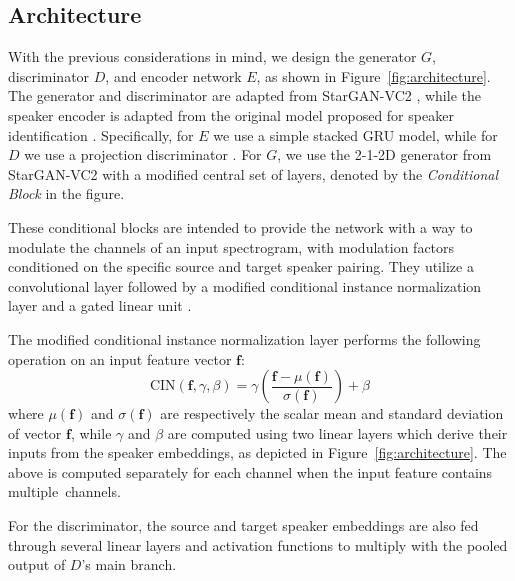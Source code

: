 \subsection{Architecture}
With the previous considerations in mind, we design the generator $G$, discriminator $D$, and encoder network $E$, as shown in Figure~\ref{fig:architecture}.
The generator and discriminator are adapted from StarGAN-VC2 \cite{stargan-vc2}, while the speaker encoder
is adapted from the original model proposed for speaker identification \cite{GE2E}. 
Specifically, for $E$ 
we use a simple stacked GRU model, while for $D$ we use a projection discriminator \cite{projection_discriminator}. 
For $G$, we use the 2-1-2D generator from StarGAN-VC2 with a modified central set of layers, denoted by the \textit{Conditional Block} in the figure. 

These conditional blocks are intended to provide the network with a way to modulate the channels of an input spectrogram, with modulation factors conditioned on the specific source and target speaker pairing.
They utilize a convolutional layer 
followed by a modified conditional instance normalization layer \cite{CIN} and a gated linear unit \cite{glu}.

The modified conditional instance normalization layer performs the following operation on an input feature vector $\mathbf{f}$:
\begin{equation}
\text{CIN}(\mathbf{f}, \gamma, \beta) 
= \gamma \left( \frac{\mathbf{f} - \mu(\mathbf{f})}{\sigma (\mathbf{f}) } \right) + \beta
\end{equation}
where $\mu(\mathbf{f})$ and $\sigma(\mathbf{f})$ are respectively the scalar mean and standard deviation of vector $\mathbf{f}$, while $\gamma$ and $\beta$ are computed using two linear layers which derive their inputs from the speaker embeddings, as depicted in Figure~\ref{fig:architecture}. The above
is computed separately for each channel when the input feature contains multiple~channels.

For the discriminator, the source and target speaker embeddings are also fed through several linear layers and activation functions to multiply with the pooled output of $D$'s main branch.
